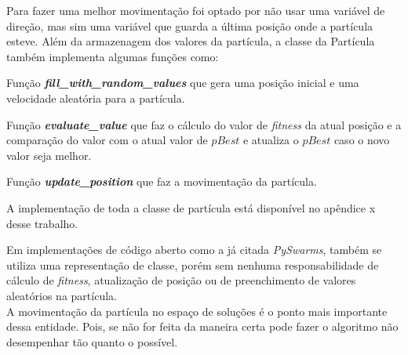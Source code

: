             Para fazer uma melhor movimentação foi optado por não usar uma variável de direção, mas sim uma variável que guarda a última posição onde a partícula esteve.\hfill
            Além da armazenagem dos valores da partícula, a classe da Partícula também implementa algumas funções como:\hfill\vspace{\onelineskip}
            
            Função \textbf{\textit{fill\_with\_random\_values}} que gera uma posição inicial e uma velocidade aleatória para a partícula.\hfill\vspace{\onelineskip}
            
            Função \textbf{\textit{evaluate\_value}} que faz o cálculo do valor de \textit{fitness} da atual posição e a comparação do valor com o atual valor de $pBest$ e atualiza o $pBest$ caso o novo valor seja melhor.\hfill\vspace{\onelineskip}

            Função \textbf{\textit{update\_position}} que faz a movimentação da partícula.\hfill\vspace{\onelineskip}
            

            \noindent A implementação de toda a classe de partícula está disponível no apêndice x desse trabalho.\hfill\vspace{\onelineskip}

            
            
            Em implementações de código aberto como a já citada \textit{PySwarms}, também se utiliza uma representação de classe, porém sem nenhuma responsabilidade de cálculo de \textit{fitness}, atualização de posição ou de preenchimento de valores aleatórios na partícula.\\


            A movimentação da partícula no espaço de soluções é o ponto mais importante dessa entidade. Pois, se não for feita da maneira certa pode fazer o algoritmo não desempenhar tão quanto o possível.\hfill\vspace{\onelineskip}
            
